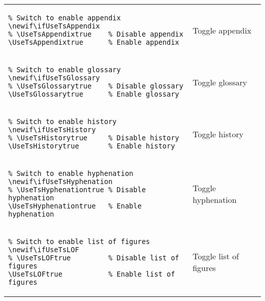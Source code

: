 \begin{footnotesize}
    \renewcommand*{\arraystretch}{1.5}
    \begin{longtable}{ | P{0.7\textwidth} | p{0.2\textwidth} | }
        \hline
         &          \\
        \hline
        \begin{BVerbatim}
\newif\ifUseTsAppendix
\UseTsAppendixtrue      %
        \end{BVerbatim}
         & Toggle appendix                   \\
        \hline
        \begin{BVerbatim}
\newif\ifUseTsGlossary
\UseTsGlossarytrue      %
        \end{BVerbatim}
         & Toggle glossary                   \\
        \hline
        \begin{BVerbatim}
\newif\ifUseTsHistory
\UseTsHistorytrue       %
        \end{BVerbatim}
         & Toggle history                    \\
        \hline
        \begin{BVerbatim}
\newif\ifUseTsHyphenation
\UseTsHyphenationtrue   %
        \end{BVerbatim}
         & Toggle \newline  hyphenation      \\
        \hline
        \begin{BVerbatim}
\newif\ifUseTsLOF
\UseTsLOFtrue           %
        \end{BVerbatim}
         & Toggle list \newline of figures   \\

\end{longtable}
\end{footnotesize}
